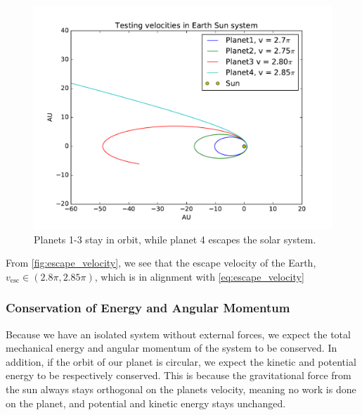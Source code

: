 \documentclass[a4paper]{article}
\begin{document}
\begin{figure}[ht]
\includegraphics[width=\textwidth]{fig/escape_velocity.pdf}
\caption{Planets 1-3 stay in orbit, while planet 4 escapes the solar system.}
\label{fig:escape_velocity}
\end{figure}

From \vref{fig:escape_velocity}, we see that the escape velocity of the Earth, $v_{\mathrm{esc}} \in (2.8\pi, 2.85\pi)$, which is in alignment with \ref{eq:escape_velocity}


\subsubsection{Conservation of Energy and Angular Momentum}
Because we have an isolated system without external forces, we expect the total mechanical energy and angular momentum of the system to be conserved. In addition, if the orbit of our planet is circular, we expect the kinetic and potential energy to be respectively conserved. This is because the gravitational force from the sun always stays orthogonal on the planets velocity, meaning no work is done on the planet, and potential and kinetic energy stays unchanged.
\end{document}

